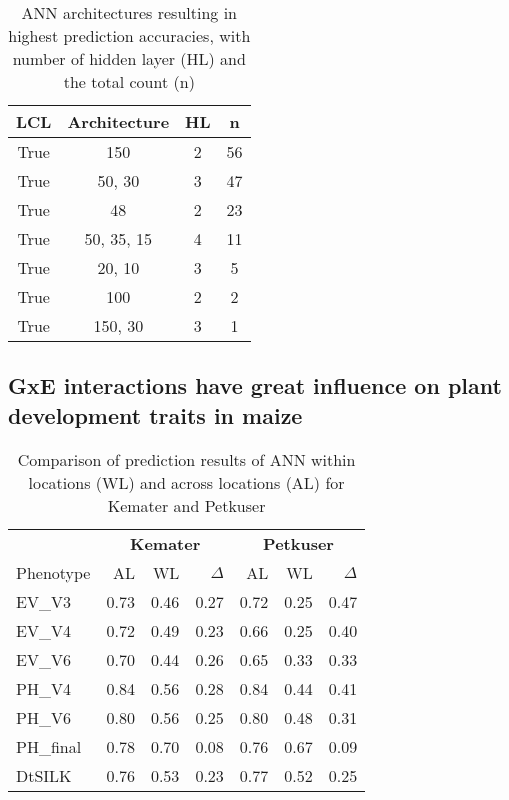 \onehalfspacing
\begin{table}[H]
  \centering
  \caption[ANN architectures of ANN resulting in highest prediction
  accuracies]{ANN architectures resulting in highest prediction
    accuracies, with number of hidden layer (HL) and the total count
    (n)}
 \begin{tabular}{cccc}
   \toprule
   LCL  & Architecture & HL & n  \\ 
   \midrule
   True & 150          & 2  & 56 \\ 
   True & 50, 30       & 3  & 47 \\ 
   True & 48           & 2  & 23 \\ 
   True & 50, 35, 15   & 4  & 11 \\ 
   True & 20, 10       & 3  & 5  \\ 
   True & 100          & 2  & 2  \\ 
   True & 150, 30      & 3  & 1  \\
   \bottomrule
\end{tabular}
\end{table}
\doublespacing





\subsection{GxE interactions have great influence on plant development traits in maize}

\onehalfspacing
\begin{table}[H]
 \centering
 \caption[Comparison of prediction results of ANN within locations and across locations for Kemater and Petkuser]{Comparison of prediction results of ANN within locations (WL) and across locations (AL) for Kemater and Petkuser}
 \begin{tabular}{lrrr|rrr}
   \toprule
   & \multicolumn{3}{c}{\textbf{Kemater}} & \multicolumn{3}{c}{\textbf{Petkuser}}    \\
   Phenotype & AL                                   & WL   & $\Delta$ & AL   & WL   & $\Delta$ \\ 
   \midrule
   EV\_V3    & 0.73                                 & 0.46 & 0.27     & 0.72 & 0.25 & 0.47     \\ 
   EV\_V4    & 0.72                                 & 0.49 & 0.23     & 0.66 & 0.25 & 0.40     \\ 
   EV\_V6    & 0.70                                 & 0.44 & 0.26     & 0.65 & 0.33 & 0.33     \\ 
   PH\_V4    & 0.84                                 & 0.56 & 0.28     & 0.84 & 0.44 & 0.41     \\ 
   PH\_V6    & 0.80                                 & 0.56 & 0.25     & 0.80 & 0.48 & 0.31     \\ 
   PH\_final & 0.78                                 & 0.70 & 0.08     & 0.76 & 0.67 & 0.09     \\ 
   DtSILK    & 0.76                                 & 0.53 & 0.23     & 0.77 & 0.52 & 0.25     \\ 
   \bottomrule
 \end{tabular}
\end{table}
\doublespacing
